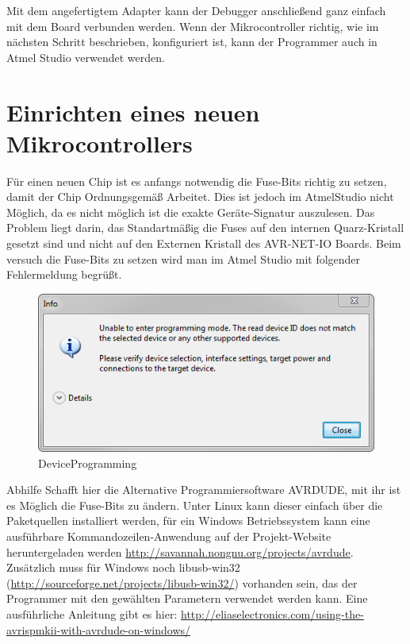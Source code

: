 
Mit dem angefertigtem Adapter kann der Debugger anschließend ganz einfach mit
dem Board verbunden werden. Wenn der Mikrocontroller richtig, wie im nächsten Schritt
beschrieben, konfiguriert ist, kann der Programmer auch in Atmel Studio
verwendet werden.

\section{Einrichten eines neuen Mikrocontrollers}

Für einen neuen Chip ist es anfangs notwendig die Fuse-Bits richtig zu setzen,
damit der Chip Ordnungsgemäß Arbeitet.
Dies ist jedoch im AtmelStudio nicht Möglich, da es nicht möglich ist die exakte
Geräte-Signatur auszulesen.
Das Problem liegt darin, das Standartmäßig die Fuses auf den internen
Quarz-Kristall gesetzt sind und nicht auf den Externen Kristall des
AVR-NET-IO Boards.
Beim versuch die Fuse-Bits zu setzen wird man im Atmel Studio mit folgender
Fehlermeldung begrüßt. 
\begin{figure}[h]
\centering
\includegraphics[width=13cm]{content/pictures/Anleitung/neuerProzessor/AnleitungNeuerProzessor2_fehler.png}
\caption{DeviceProgramming}
\end{figure}

Abhilfe Schafft hier die Alternative Programmiersoftware AVRDUDE, mit ihr ist
es Möglich die Fuse-Bits zu ändern. Unter Linux kann dieser einfach über die
Paketquellen installiert werden, für ein Windows Betriebssystem kann eine
ausführbare Kommandozeilen-Anwendung auf der Projekt-Website heruntergeladen
werden \url{http://savannah.nongnu.org/projects/avrdude}. Zusätzlich muss für
Windows noch libusb-win32 (\url{http://sourceforge.net/projects/libusb-win32/})
vorhanden sein, das der Programmer mit den gewählten Parametern verwendet werden
kann. Eine ausführliche Anleitung gibt es hier:
\url{http://eliaselectronics.com/using-the-avrispmkii-with-avrdude-on-windows/}

